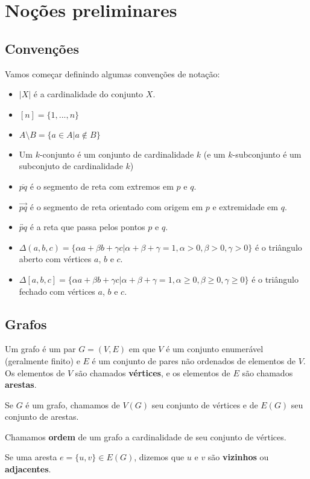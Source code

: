 \chapter{Noções preliminares}
\section{Convenções}
Vamos começar definindo algumas convenções de notação:
\begin{itemize}
    \item $|X|$ é a cardinalidade do conjunto $X$.
    \item $[n]=\{1,...,n\}$
    \item $A\setminus B = \{a\in A|a\notin B\}$
    \item Um $k$-conjunto é um conjunto de cardinalidade $k$ (e um $k$-subconjunto é um subconjuto de cardinalidade $k$)
    \item $\overline{pq}$ é o segmento de reta com extremos em $p$ e $q$.
    \item $\overrightarrow{pq}$ é o segmento de reta orientado com origem em $p$ e extremidade em $q$.
    \item $\overleftrightarrow{pq}$ é a reta que passa pelos pontos $p$ e $q$.
    \item $\Delta(a,b,c)=\{\alpha a+\beta b+\gamma c|\alpha+\beta+\gamma=1, \alpha>0, \beta>0, \gamma>0\}$ é o triângulo aberto com vértices $a$, $b$ e $c$.
    \item $\Delta[a,b,c]=\{\alpha a+\beta b+\gamma c|\alpha+\beta+\gamma=1, \alpha\geq0, \beta\geq0, \gamma\geq0\}$ é o triângulo fechado com vértices $a$, $b$ e $c$.
\end{itemize}

\section{Grafos}
Um grafo é um par $G=(V,E)$ em que $V$ é um conjunto enumerável (geralmente finito) e $E$ é um conjunto de pares não ordenados de elementos de $V$. Os elementos de $V$ são chamados \textbf{vértices}, e os elementos de $E$ são chamados \textbf{arestas}.

Se $G$ é um grafo, chamamos de $V(G)$ seu conjunto de vértices e de $E(G)$ seu conjunto de arestas.

Chamamos \textbf{ordem} de um grafo a cardinalidade de seu conjunto de vértices.

Se uma aresta $e=\{u,v\}\in E(G)$, dizemos que $u$ e $v$ são \textbf{vizinhos} ou \textbf{adjacentes}.

